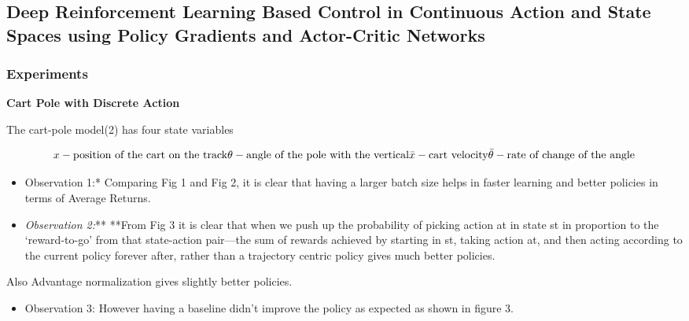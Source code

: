 \documentclass[10pt]{article}
\date{\vspace{-5ex}}
\begin{document}
\subsection{Deep Reinforcement Learning Based Control in Continuous
Action and State Spaces using Policy Gradients and Actor-Critic
Networks}

\subsubsection{Experiments}

\textbf{Cart Pole with Discrete Action}

The cart-pole model(2) has four state variables

\[
x - \text{position of the cart on the track} \\
\theta - \text{angle of the pole with the vertical} \\
\bar{x} - \text{cart velocity} \\
\bar{\theta} - \text{rate of change of the angle}
\]

\begin{itemize}
\item
  Observation 1:* Comparing Fig 1 and Fig 2, it is clear that having a
  larger batch size helps in faster learning and better policies in
  terms of Average Returns.
\item
  \emph{Observation 2:}** **From Fig 3 it is clear that when we push up
  the probability of picking action at in state st in proportion to the
  ‘reward-to-go’ from that state-action pair—the sum of rewards achieved
  by starting in st, taking action at, and then acting according to the
  current policy forever after, rather than a trajectory centric policy
  gives much better policies.
\end{itemize}

Also Advantage normalization gives slightly better policies.

\begin{itemize}
\item
  Observation 3: However having a baseline didn’t improve the policy as
  expected as shown in figure 3.
\end{itemize}
\end{document}
